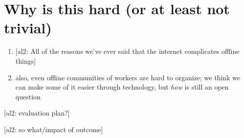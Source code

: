 \documentclass[10pt]{article}
\newcommand{\ali}[1]{{\color{Red}[al2: #1]}}
\begin{document}
\section*{Why is this hard (or at least not trivial)}
\begin{enumerate}

  \item \ali{All of the reasons we've ever said that the internet complicates offline things}
  \item also, even offline communities of workers are hard to organize;
        we think we can make some of it easier through technology, but \textit{how} is still an open question
\end{enumerate}

\ali{evaluation plan?}

\ali{so what/impact of outcome}

\printbibliography{}
\end{document}
